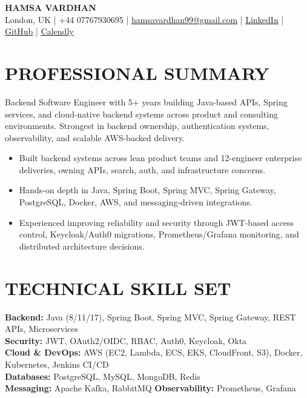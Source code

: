 \documentclass[10pt]{article}
\begin{document}
\begin{center}
{\Large \textbf{HAMSA VARDHAN}}\\[2pt]
London, UK \;|\; +44 07767930695 \;|\;
\href{mailto:hamsavardhan99@gmail.com}{hamsavardhan99@gmail.com} \;|\;
\href{https://linkedin.com/in/hamsa-vardhan}{\underline{LinkedIn}} \;|\;
\href{https://github.com/hamsa-vd}{\underline{GitHub}} \;|\;
\href{https://calendly.com/hamsa-vd/intro-call}{\underline{Calendly}}
\end{center}

\vspace{-2pt}

\section*{PROFESSIONAL SUMMARY}

Backend Software Engineer with 5+ years building Java-based APIs, Spring services, and cloud-native backend systems across product and consulting environments. Strongest in backend ownership, authentication systems, observability, and scalable AWS-backed delivery.
\begin{itemize}
  \item Built backend systems across lean product teams and 12-engineer enterprise deliveries, owning APIs, search, auth, and infrastructure concerns.
  \item Hands-on depth in Java, Spring Boot, Spring MVC, Spring Gateway, PostgreSQL, Docker, AWS, and messaging-driven integrations.
  \item Experienced improving reliability and security through JWT-based access control, Keycloak/Auth0 migrations, Prometheus/Grafana monitoring, and distributed architecture decisions.
\end{itemize}

\section*{TECHNICAL SKILL SET}

\textbf{Backend:} Java (8/11/17), Spring Boot, Spring MVC, Spring Gateway, REST APIs, Microservices\\
\textbf{Security:} JWT, OAuth2/OIDC, RBAC, Auth0, Keycloak, Okta\\
\textbf{Cloud \& DevOps:} AWS (EC2, Lambda, ECS, EKS, CloudFront, S3), Docker, Kubernetes, Jenkins CI/CD\\
\textbf{Databases:} PostgreSQL, MySQL, MongoDB, Redis\\
\textbf{Messaging:} Apache Kafka, RabbitMQ \quad
\textbf{Observability:} Prometheus, Grafana
\end{document}
